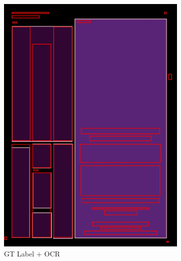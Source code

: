 \documentclass[aspectratio=1610]{beamer}
\begin{document}
\begin{frame}
\begin{figure}
\begin{subfigure}{.25\textwidth}
  \includegraphics[width=0.99\linewidth, clip=true, trim = 0mm 0mm 0mm 0mm]{figures/ocr_bbox/9rwJ51v.jpg}
  \caption{GT Label + OCR}
\end{subfigure}%
\begin{subfigure}{.25\textwidth}
  \centering

\end{subfigure}
\end{figure}
\end{frame}
\end{document}
